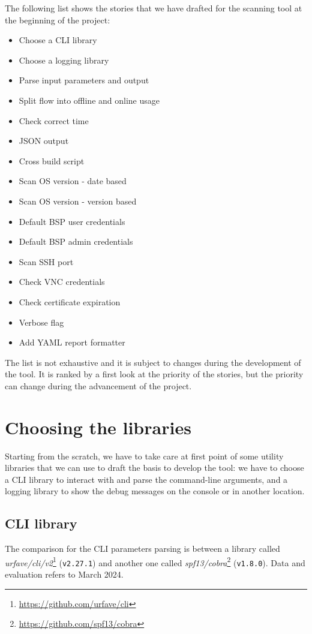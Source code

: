 The following list shows the stories that we have drafted for the scanning tool at the beginning of the project:
\begin{itemize}
  \item Choose a CLI library
  \item Choose a logging library
  \item Parse input parameters and output
  \item Split flow into offline and online usage
  \item Check correct time
  \item JSON output
  \item Cross build script
  \item Scan OS version - date based
  \item Scan OS version - version based
  \item Default BSP user credentials
  \item Default BSP admin credentials
  \item Scan SSH port
  \item Check VNC credentials
  \item Check certificate expiration
  \item Verbose flag
  \item Add YAML report formatter
\end{itemize}

The list is not exhaustive and it is subject to changes during the development of the tool. It is ranked by a first look at the priority of the stories, but the priority can change during the advancement of the project.

\section{Choosing the libraries}

Starting from the scratch, we have to take care at first point of some utility libraries that we can use to draft the basis to develop the tool: we have to choose a CLI library to interact with and parse the command-line arguments, and a logging library to show the debug messages on the console or in another location.

\subsection{CLI library}

The comparison for the CLI parameters parsing is between a library called \textit{urfave/cli/v2}\footnote{\url{https://github.com/urfave/cli}} (\texttt{v2.27.1}) and another one called \textit{spf13/cobra}\footnote{\url{https://github.com/spf13/cobra}} (\texttt{v1.8.0}). Data and evaluation refers to March 2024.

